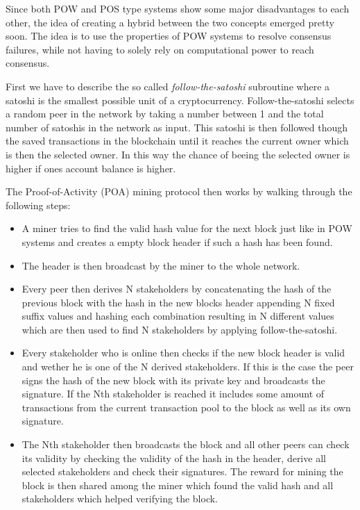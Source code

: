 Since both POW and POS type systems show some major disadvantages to each other, the idea of creating a hybrid between the two concepts emerged pretty soon. The idea is to use the properties of POW
systems to resolve consensus failures, while not having to solely rely on computational power to reach consensus.\par
First we have to describe the so called \textit{follow-the-satoshi} subroutine
where a satoshi is the smallest possible unit of a cryptocurrency. Follow-the-satoshi selects a random peer in the network by taking a number between 1 and the total number of
satoshis in the network as input. This satoshi is then followed though the saved transactions in the blockchain until it reaches the current owner which is then the selected owner. In this way the chance
of beeing the selected owner is higher if ones account balance is higher.\par
The Proof-of-Activity (POA) mining protocol then works by walking through the following steps:
\begin{itemize}
    \item A miner tries to find the valid hash value for the next block just like in POW systems and creates a empty block header if such a hash has been found.
    \item The header is then broadcast by the miner to the whole network.
    \item Every peer then derives N stakeholders by concatenating the hash of the previous block with the hash in the new blocks header appending N fixed suffix values and hashing each combination
    resulting in N different values which are then used to find N stakeholders by applying follow-the-satoshi.
    \item Every stakeholder who is online then checks if the new block header is valid and wether he is one of the N derived stakeholders. If this is the case the peer signs the hash of the new block
    with its private key and broadcasts the signature. If the Nth stakeholder is reached it includes some amount of transactions from the current transaction pool to the block as well as its own
    signature.
    \item The Nth stakeholder then broadcasts the block and all other peers can check its validity by checking the validity of the hash in the header, derive all selected stakeholders and check their
    signatures. The reward for mining the block is then shared among the miner which found the valid hash and all stakeholders which helped verifying the block.
\end{itemize}

